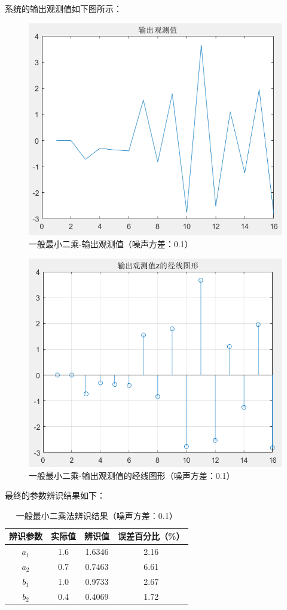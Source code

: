 \documentclass[UTF8]{article}
\begin{document}
系统的输出观测值如下图所示：
\begin{figure}[H]
    \centering %
    \includegraphics[width=.8\textwidth]{figure/一般最小二乘-输出观测值.png} 
    \caption{一般最小二乘-输出观测值（噪声方差：0.1）} %
\end{figure}
\begin{figure}[H]
    \centering %
    \includegraphics[width=.8\textwidth]{figure/一般最小二乘-输出观测值的经线图形.png} 
    \caption{一般最小二乘-输出观测值的经线图形（噪声方差：0.1）} %
\end{figure}

最终的参数辨识结果如下：
\begin{table}[H]
\centering %
\begin{tabular}{cccc} %
    \toprule %
    辨识参数 & 实际值 & 辨识值 & 误差百分比（\%） \\
    \midrule %
    $a_1$ & 1.6 & 1.6346 & 2.16 \\
    $a_2$ & 0.7 & 0.7463 & 6.61 \\
    $b_1$ & 1.0 & 0.9733 & 2.67 \\
    $b_2$ & 0.4 & 0.4069 & 1.72 \\
    \bottomrule %
\end{tabular}
\caption{一般最小二乘法辨识结果（噪声方差：0.1）} %
\end{table}
\end{document}

